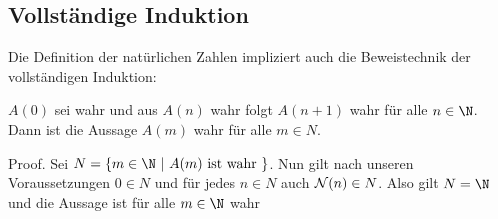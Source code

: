 \documentclass[letterpaper,10pt,english]{jupyterBook}
\begin{document}
\subsection{Vollständige Induktion}
\label{\detokenize{grundlagen/zahlensysteme:vollstandige-induktion}}
Die Definition der natürlichen Zahlen impliziert auch die Beweistechnik der vollständigen Induktion:
\label{grundlagen/zahlensysteme:theorem-1}
\begin{theorem}{}{}



\(A(0)\) sei wahr und aus \(A(n)\) wahr folgt \(A(n+1)\) wahr für alle \(n \in \N\). Dann ist die Aussage \(A(m)\) wahr für alle \(m \in N\).
\end{theorem}

\begin{emphBox}{}{}
Proof.  Sei \(N=\{m \in \N~|~A(m) \text{ ist wahr }\}\). Nun gilt nach unseren Voraussetzungen \(0 \in N\) und für jedes \(n \in N\) auch \({\cal N}(n) \in N\). Also gilt \(N= \N\) und die Aussage ist für alle \(m \in \N\) wahr
\end{emphBox}
\end{document}
